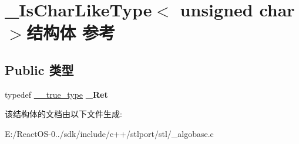 \hypertarget{struct___is_char_like_type_3_01unsigned_01char_01_4}{}\section{\+\_\+\+Is\+Char\+Like\+Type$<$ unsigned char $>$结构体 参考}
\label{struct___is_char_like_type_3_01unsigned_01char_01_4}
\subsection*{Public 类型}
\begin{DoxyCompactItemize}
\item 
\mbox{\label{struct___is_char_like_type_3_01unsigned_01char_01_4_ae77fc63197c48b52d45c1975fb8f1f57}} 
typedef \hyperlink{struct____true__type}{\+\_\+\+\_\+true\+\_\+type} {\bfseries \+\_\+\+Ret}
\end{DoxyCompactItemize}


该结构体的文档由以下文件生成\+:\begin{DoxyCompactItemize}
\item 
E\+:/\+React\+O\+S-\/0../sdk/include/c++/stlport/stl/\+\_\+algobase.\+c\end{DoxyCompactItemize}
